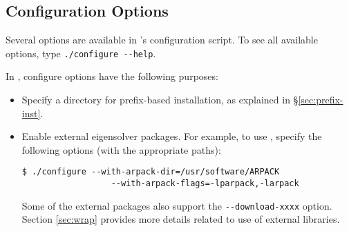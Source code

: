 \subsection{Configuration Options}
\label{sec:opt-inst}

Several options are available in \slepc's configuration script. To see all available options, type \Verb!./configure --help!.

In \slepc, configure options have the following purposes:
\begin{itemize}
\item Specify a directory for prefix-based installation, as explained in \S\ref{sec:prefix-inst}.
\item Enable external eigensolver packages. For example, to use \arpack, specify the following options (with the appropriate paths):
	\begin{Verbatim}[fontsize=\small]
	$ ./configure --with-arpack-dir=/usr/software/ARPACK
	              --with-arpack-flags=-lparpack,-larpack
	\end{Verbatim}
Some of the external packages also support the \Verb!--download-xxxx! option. Section \ref{sec:wrap} provides more details related to use of external libraries.
\end{itemize}

